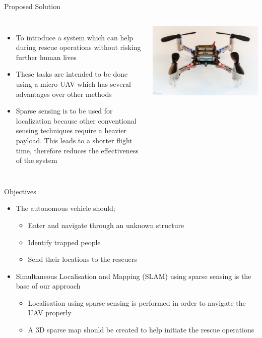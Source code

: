 \documentclass[xcolor=table]{beamer}
\begin{document}
\begin{frame}{Proposed Solution}
  \begin{columns}
  \begin{itemize}
  \item To introduce a system which can help during rescue operations without risking further human lives
  \item These tasks are intended to be done using a micro UAV which has several advantages over other methods  
  \item Sparse sensing is to be used for localization because other conventional sensing techniques require a heavier payload. This leads to a shorter flight time, therefore reduces the effectiveness of the system
  \end{itemize}
  \begin{center}
  \includegraphics[scale=0.4]{Crazy_Flie_img.jpg}
  \end{center}
  \end{columns}
\end{frame}

\begin{frame}{Objectives}
  \begin{itemize}
  \item The autonomous vehicle should;
    \begin{itemize}
  	\item Enter and navigate through an unknown structure
  	\item Identify trapped people
  	\item Send their locations to the rescuers
  	\end{itemize}
  \item Simultaneous Localisation and Mapping (SLAM) using sparse sensing is the base of our approach
    \begin{itemize}
  	\item Localisation using sparse sensing is performed in order to navigate the UAV properly
  	\item A 3D sparse map should be created to help initiate the rescue operations
  	\end{itemize}
  \end{itemize}
\end{frame}
\end{document}
